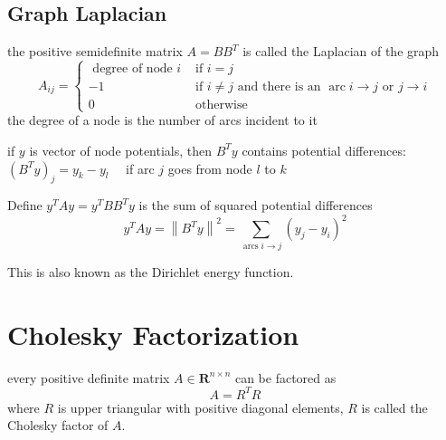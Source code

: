 \subsection{Graph Laplacian}

\begin{definition}
    the positive semidefinite matrix $ A=B B^{T} $ is called the Laplacian of the graph
\begin{equation}
A_{i j}=\left\{\begin{array}{ll}
\text { degree of node } i & \text { if } i=j \\
-1 & \text { if } i \neq j \text { and there is an } \operatorname{arc} i \rightarrow j \text { or } j \rightarrow i \\
0 & \text { otherwise }
\end{array}\right.
\end{equation}
the degree of a node is the number of arcs incident to it
\end{definition}

\begin{theorem}
    if $ y $ is vector of node potentials, then $ B^{T} y $ contains potential differences:
$ \left(B^{T} y\right)_{j}=y_{k}-y_{l} \quad $ if arc $ j $ goes from node $ l $ to $ k $
\end{theorem}

\begin{theorem}
    Define $ y^{T} A y=y^{T} B B^{T} y $ is the sum of squared potential differences
\begin{equation}
y^{T} A y=\left\|B^{T} y\right\|^{2}=\sum_{\operatorname{arcs} i \rightarrow j}\left(y_{j}-y_{i}\right)^{2}
\end{equation}

This is also known as the Dirichlet energy function.
\end{theorem}

\section{Cholesky Factorization}

\begin{theorem}
    every positive definite matrix $ A \in \mathbf{R}^{n \times n} $ can be factored as
\begin{equation}
A=R^{T} R
\end{equation}
where $ R $ is upper triangular with positive diagonal elements, $ R $ is called the Cholesky factor of $ A $.
\end{theorem}

